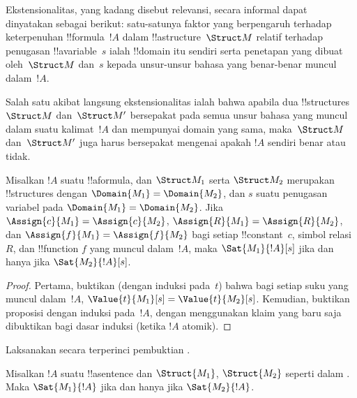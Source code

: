 \documentclass[../../../include/open-logic-section]{subfiles}
\begin{document}


\begin{explain}
Ekstensionalitas, yang kadang disebut relevansi, secara informal dapat
dinyatakan sebagai berikut: satu-satunya faktor yang berpengaruh terhadap
keterpenuhan !!{formula}~$!A$ dalam !!a{structure}~$\Struct M$ relatif
terhadap penugasan !!a{variable}~$s$ ialah !!{domain} itu sendiri serta penetapan
yang dibuat oleh~$\Struct M$ dan~$s$ kepada unsur-unsur bahasa yang
benar-benar muncul dalam~$!A$.

Salah satu akibat langsung ekstensionalitas ialah bahwa apabila dua
!!{structure}s~$\Struct M$ dan~$\Struct M'$ bersepakat pada semua unsur
bahasa yang muncul dalam suatu kalimat~$!A$ dan mempunyai domain yang sama,
maka~$\Struct M$ dan~$\Struct M'$ juga harus bersepakat mengenai apakah
$!A$ sendiri benar atau tidak.
\end{explain}

\begin{prop}[Ekstensionalitas]
  Misalkan $!A$ suatu !!a{formula}, dan $\Struct M_1$ serta $\Struct M_2$
  merupakan !!{structure}s dengan $\Domain{M_1} = \Domain{M_2}$, dan $s$
  suatu penugasan variabel pada $\Domain{M_1} = \Domain{M_2}$. Jika
  $\Assign{c}{M_1} = \Assign{c}{M_2}$, $\Assign{R}{M_1}=\Assign{R}{M_2}$,
  dan $\Assign{f}{M_1} = \Assign{f}{M_2}$ bagi setiap !!{constant}~$c$,
  simbol relasi~$R$, dan !!{function} $f$ yang muncul dalam~$!A$, maka
  $\Sat{M_1}{!A}[s]$ jika dan hanya jika $\Sat{M_2}{!A}[s]$.
\end{prop}

\begin{proof}
  Pertama, buktikan (dengan induksi pada~$t$) bahwa bagi setiap suku yang
  muncul dalam~$!A$,
  $\Value{t}{M_1}[s] = \Value{t}{M_2}[s]$. Kemudian, buktikan proposisi
  dengan induksi pada~$!A$, dengan menggunakan klaim yang baru saja
  dibuktikan bagi dasar induksi (ketika $!A$ atomik).
\end{proof}

\begin{prob}
Laksanakan secara terperinci pembuktian
.
\end{prob}

\begin{cor}
  Misalkan $!A$ suatu !!a{sentence} dan $\Struct{M_1}$, $\Struct{M_2}$
  seperti dalam . Maka $\Sat{M_1}{!A}$ jika dan
  hanya jika $\Sat{M_2}{!A}$.
\end{cor}
\end{document}
